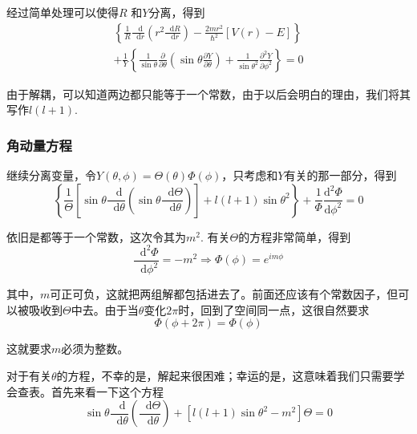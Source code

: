 \documentclass[UTF8]{ctexart}
\begin{document}
\noindent 经过简单处理可以使得$R$ 和$Y$分离，得到
\begin{equation}
\begin{array}{l}{\left\{\frac{1}{R} \frac{\mathop{}\!\mathrm{d}}{\mathop{}\!\mathrm{d} r}\left(r^{2} \frac{\mathop{}\!\mathrm{d} R}{\mathop{}\!\mathrm{d} r}\right)-\frac{2 m r^{2}}{\hbar^{2}}[V(r)-E]\right\}} \\ {+\frac{1}{Y}\left\{\frac{1}{\sin \theta} \frac{\partial}{\partial \theta}\left(\sin \theta \frac{\partial Y}{\partial \theta}\right)+\frac{1}{\sin \theta^{2}} \frac{\partial^{2} Y}{\partial \phi^{2}}\right\}=0}\end{array}
\end{equation}

\noindent 由于解耦，可以知道两边都只能等于一个常数，由于以后会明白的理由，我们将其写作$l(l+1)$.

    \subsubsection{角动量方程}
    继续分离变量，令$Y(\theta,\phi) = \Theta(\theta)\Phi(\phi)$，只考虑和$Y$有关的那一部分，得到
    \begin{equation}
        \left\{\frac{1}{\Theta}\left[\sin \theta \frac{\mathop{}\!\mathrm{d} }{\mathop{}\!\mathrm{d}  \theta}\left(\sin \theta \frac{\mathop{}\!\mathrm{d}  \Theta}{\mathop{}\!\mathrm{d}  \theta}\right)\right]+l(l+1) \sin \theta^{2}\right\}+\frac{1}{\Phi} \frac{\mathrm{d}^{2} \Phi}{\mathrm{d} \phi^{2}}=0
        \end{equation}

\noindent 依旧是都等于一个常数，这次令其为$m^2$. 有关$\Theta$的方程非常简单，得到
\begin{equation}
    \frac{\mathop{}\!\mathrm{d}^2 \Phi}{\mathop{}\!\mathrm{d} \phi^2} = -m^2 \Rightarrow \Phi(\phi) = e^{i m \phi} \label{equ4.9}
\end{equation}

\noindent 其中，$m$可正可负，这就把两组解都包括进去了。前面还应该有个常数因子，但可以被吸收到$\Theta$中去。由于当$\theta$变化$2 \pi$时，回到了空间同一点，这很自然要求
\begin{equation}
    \Phi(\phi + 2 \pi) = \Phi(\phi)
\end{equation}

\noindent 这就要求$m$必须为整数。

    对于有关$\theta$的方程，不幸的是，解起来很困难；幸运的是，这意味着我们只需要学会查表。首先来看一下这个方程
    \begin{equation}
        \sin \theta \frac{\mathop{}\!\mathrm{d} }{\mathop{}\!\mathrm{d} \theta} \left(\frac{\mathop{}\!\mathrm{d} \Theta}{\mathop{}\!\mathrm{d} \theta}\right) + \left[l(l+1) \sin \theta^2 - m^2 \right] \Theta = 0 \label{equ4.4}
    \end{equation}
\end{document}
